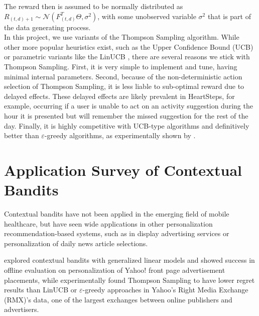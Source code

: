 The reward then is assumed to be normally distributed as $R_{(t,d) + 1} \sim \mathcal{N}\left(F_{(t,d)}^T \Theta, \sigma^2\right)$, with some unobserved variable $\sigma^2$ that is part of the data generating process. \\


In this project, we use variants of the Thompson Sampling algorithm. While other more popular heuristics exist, such as the Upper Confidence Bound (UCB) or parametric variants like the LinUCB \citep{Li2010}, there are several reasons we stick with Thompson Sampling.  First, it is very simple to implement and tune, having minimal internal parameters. Second, because of the non-deterministic action selection of Thompson Sampling, it is less liable to sub-optimal reward due to delayed effects.  These delayed effects are likely prevalent in HeartSteps, for example, occurring if a user is unable to act on an activity suggestion during the hour it is presented but will remember the missed suggestion for the rest of the day.  Finally, it is highly competitive with UCB-type algorithms and definitively better than $\varepsilon$-greedy algorithms, as experimentally shown by \citet{Chapelle2011}.



\section{Application Survey of Contextual Bandits}

Contextual bandits have not been applied in the emerging field of mobile healthcare, but have seen wide applications in other personalization recommendation-based systems, such as in display advertising services or personalization of daily news article selections.

\citet{Li2011} explored contextual bandits with generalized linear models and showed success in offline evaluation on personalization of Yahoo! front page advertisement placements, while \citet{Chapelle2014} experimentally found Thompson Sampling to have lower regret results than LinUCB or $\varepsilon$-greedy approaches in Yahoo's Right Media Exchange (RMX)'s data, one of the largest exchanges between online publishers and advertisers.

